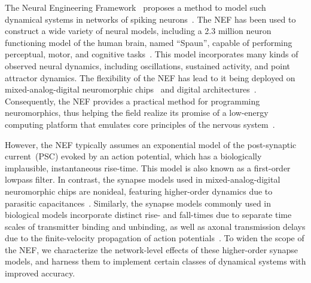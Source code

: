 

The Neural Engineering Framework~\citep[NEF;][]{eliasmith1999developing, eliasmith2003a} proposes a method to model such dynamical systems in networks of spiking neurons~\citep[see][for reviews of other methods]{abbott2016building, deneve2016efficient}.
The NEF has been used to construct a wide variety of neural models, including a 2.3 million neuron functioning model of the human brain, named ``Spaun'', capable of performing perceptual, motor, and cognitive tasks~\citep{eliasmith2012}.
This model incorporates many kinds of observed neural dynamics, including oscillations, sustained activity, and point attractor dynamics.
The flexibility of the NEF has lead to it being deployed on mixed-analog-digital neuromorphic chips~\citep{choudhary2012silicon, corradi2014, voelker2017iscas, voelker2017neuromorphic} and digital architectures~\citep{bekolay2013, wang2014compact, mundy2015efficient, berzish2016}.
Consequently, the NEF provides a practical method for programming neuromorphics, thus helping the field realize its promise of a low-energy computing platform that emulates core principles of the nervous system~\citep{boahen2017neuromorph}.

However, the NEF typically assumes an exponential model of the post-synaptic current~(PSC) evoked by an action potential, which has a biologically implausible, instantaneous rise-time.
This model is also known as a first-order lowpass filter.
In contrast, the synapse models used in mixed-analog-digital neuromorphic chips are nonideal, featuring higher-order dynamics due to parasitic capacitances~\citep{voelker2017iscas}.
Similarly, the synapse models commonly used in biological models incorporate distinct rise- and fall-times due to separate time scales of transmitter binding and unbinding, as well as axonal transmission delays due to the finite-velocity propagation of action potentials~\citep{roth2009modeling}.
To widen the scope of the NEF, we characterize the network-level effects of these higher-order synapse models, and harness them to implement certain classes of dynamical systems with improved accuracy.

